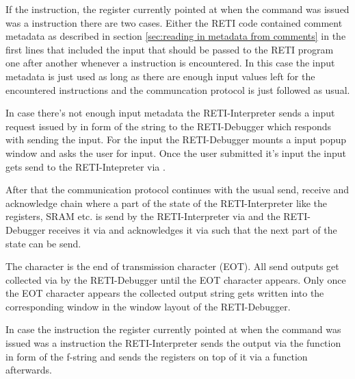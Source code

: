 \documentclass{report}
\begin{document}
If the instruction, the  register currently pointed at when the  command was issued was a  instruction there are two cases. Either the RETI code contained \alert{comment metadata} as described in section \ref{sec:reading in metadata from comments} in the first lines that included the input that should be passed to the RETI program one after another whenever a  instruction is encountered. In this case the input metadata is just used as long as there are enough input values left for the encountered  instructions and the communcation protocol is just followed as usual.

In case there's not enough input metadata the RETI-Interpreter sends a input request issued by  in form of the string  to the RETI-Debugger which responds with sending the input. For the input the RETI-Debugger mounts a input popup window and asks the user for input. Once the user submitted it's input the input gets send to the RETI-Intepreter via .

After that the communication protocol continues with the usual send, receive and acknowledge chain where a part of the state of the RETI-Interpreter like the registers, SRAM etc. is send by the RETI-Interpreter via  and the RETI-Debugger receives it via  and acknowledges it via  such that the next part of the state can be send.

The character  is the end of transmission character (\alert{EOT}). All send outputs get collected via  by the RETI-Debugger until the EOT character  appears. Only once the EOT character appears the collected output  string gets written into the corresponding window in the window layout of the RETI-Debugger.


In case the instruction the  register currently pointed at when the  command was issued was a  instruction the RETI-Interpreter sends the output via the  function in form of the f-string  and sends the registers on top of it via a  function afterwards.
\end{document}
